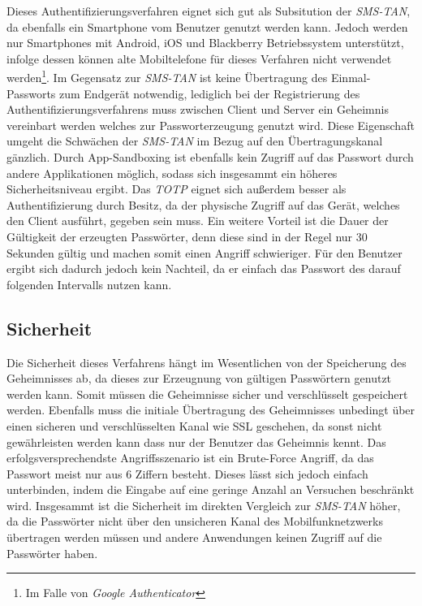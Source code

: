\documentclass[11pt,a4paper,ngerman]{scrreprt}
\begin{document}
Dieses Authentifizierungsverfahren eignet sich gut als Subsitution der \textit{SMS-TAN}, da ebenfalls ein Smartphone vom Benutzer genutzt werden kann. Jedoch werden nur Smartphones mit Android, iOS und Blackberry Betriebssystem unterstützt, infolge dessen können alte Mobiltelefone für dieses Verfahren nicht verwendet werden\footnote{Im Falle von \textit{Google Authenticator}}. Im Gegensatz zur \textit{SMS-TAN} ist keine Übertragung des Einmal-Passworts zum Endgerät notwendig, lediglich bei der Registrierung des Authentifizierungsverfahrens muss zwischen Client und Server ein Geheimnis vereinbart werden welches zur Passworterzeugung genutzt wird. Diese Eigenschaft umgeht die Schwächen der \textit{SMS-TAN} im Bezug auf den Übertragungskanal gänzlich. Durch App-Sandboxing ist ebenfalls kein Zugriff auf das Passwort durch andere Applikationen möglich, sodass sich insgesammt ein höheres Sicherheitsniveau ergibt. Das \textit{TOTP} eignet sich außerdem besser als Authentifizierung durch Besitz, da der physische Zugriff auf das Gerät, welches den Client ausführt, gegeben sein muss. Ein weitere Vorteil ist die Dauer der Gültigkeit der erzeugten Passwörter, denn diese sind in der Regel nur 30 Sekunden gültig und machen somit einen Angriff schwieriger. Für den Benutzer ergibt sich dadurch jedoch kein Nachteil, da er einfach das Passwort des darauf folgenden Intervalls nutzen kann.

\subsection{Sicherheit}
Die Sicherheit dieses Verfahrens hängt im Wesentlichen von der Speicherung des Geheimnisses ab, da dieses zur Erzeugnung von gültigen Passwörtern genutzt werden kann. Somit müssen die Geheimnisse sicher und verschlüsselt gespeichert werden. Ebenfalls muss die initiale Übertragung des Geheimnisses unbedingt über einen sicheren und verschlüsselten Kanal wie SSL geschehen, da sonst nicht gewährleisten werden kann dass nur der Benutzer das Geheimnis kennt. Das erfolgsversprechendste Angriffsszenario ist ein Brute-Force Angriff, da das Passwort meist nur aus 6 Ziffern besteht. Dieses lässt sich jedoch einfach unterbinden, indem die Eingabe auf eine geringe Anzahl an Versuchen beschränkt wird. Insgesammt ist die Sicherheit im direkten Vergleich zur \textit{SMS-TAN} höher, da die Passwörter nicht über den unsicheren Kanal des Mobilfunknetzwerks übertragen werden müssen und andere Anwendungen keinen Zugriff auf die Passwörter haben.
\end{document}
